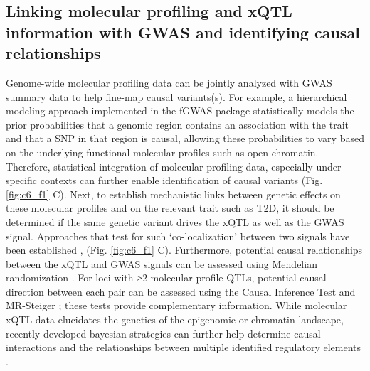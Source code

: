 \subsection{Linking molecular profiling and xQTL information with GWAS and identifying causal relationships}                
Genome-wide molecular profiling data can be jointly analyzed with GWAS summary data to help fine-map causal variants(s). For example, a hierarchical modeling approach implemented in the fGWAS package \cite{pickrellJointAnalysisFunctional2014} statistically models the prior probabilities that a genomic region contains an association with the trait and that  a SNP in that region is causal, allowing these probabilities to vary based on the underlying functional molecular profiles such as open chromatin. Therefore, statistical integration of molecular profiling data, especially under specific contexts can further enable identification of causal variants (Fig. \ref{fig:c6_f1} C). Next, to establish mechanistic links between genetic effects on these molecular profiles and on the relevant trait such as T2D, it should be determined if the same genetic variant drives the xQTL as well as the GWAS signal. Approaches that test for such ‘co-localization’ between two signals have been established \cite{giambartolomeiBayesianTestColocalisation2014, nicaCandidateCausalRegulatory2010, hormozdiariColocalizationGWASEQTL2016}, (Fig. \ref{fig:c6_f1} C). Furthermore, potential causal relationships between the xQTL and GWAS signals can be assessed using Mendelian randomization \cite{hormozdiariColocalizationGWASEQTL2016}. For loci with ≥2 molecular profile QTLs, potential causal direction between each pair can be assessed using the Causal Inference Test \cite{millsteinDisentanglingMolecularRelationships2009} and MR-Steiger \cite{hemaniOrientingCausalRelationship2017}; these tests provide complementary information. While molecular xQTL data elucidates the genetics of the epigenomic or chromatin landscape, recently developed bayesian strategies \cite{kumasakaHighresolutionGeneticMapping2019} can further help determine causal interactions and the relationships between multiple identified regulatory elements .
                
                        
